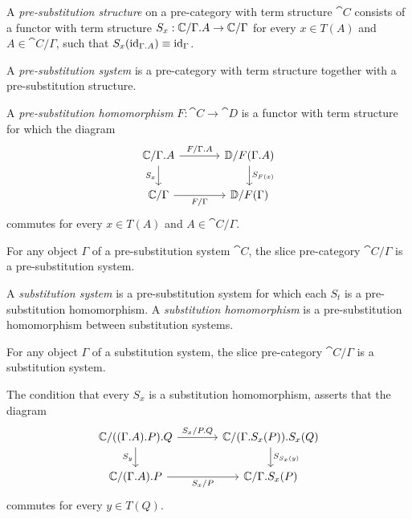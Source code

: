 \begin{defn}
A \emph{pre-substitution structure} on a pre-category with term structure $\cat{C}$ consists
of a functor with term structure $S_x:\cat{C}/\ctxext{\Gamma}{A}\to\cat{C}/\Gamma$ for every $x\in T(A)$ and
$A\in\cat{C}/\Gamma$, such that $S_x(\catid{\ctxext{\Gamma}{A}})\jdeq\catid{\Gamma}$.

A \emph{pre-substitution system} is a pre-category with term structure together with a
pre-substitution structure. 
\end{defn}

\begin{defn}
A \emph{pre-substitution homomorphism} $F:\cat{C}\to\cat{D}$ is a functor with term structure for
which the diagram
\begin{equation*}
\begin{tikzcd}[column sep=large]
\cat{C}/\ctxext{\Gamma}{A}
  \arrow[r,"F/\ctxext{\Gamma}{A}"]
  \arrow[d,swap,"S_x"]
  &
\cat{D}/F(\ctxext{\Gamma}{A})
  \arrow[d,"S_{F(x)}"]
  \\
\cat{C}/\Gamma
  \arrow[r,swap,"F/\Gamma"]
  &
\cat{D}/F(\Gamma)
\end{tikzcd}
\end{equation*}
commutes for every $x\in T(A)$ and $A\in\cat{C}/\Gamma$.
\end{defn}

\begin{lem}
For any object $\Gamma$ of a pre-substitution system $\cat{C}$, the slice pre-category
$\cat{C}/\Gamma	$ is a pre-substitution system.
\end{lem}

\begin{defn}
A \emph{substitution system} is a pre-substitution system for which each
$S_t$ is a pre-substitution homomorphism. A \emph{substitution homomorphism} is a
pre-substitution homomorphism between substitution systems.
\end{defn}

\begin{cor}
For any object $\Gamma$ of a substitution system, the slice pre-category $\cat{C}/\Gamma$
is a substitution system.
\end{cor}

\begin{rmk}
The condition that every $S_x$ is a substitution homomorphism, asserts that
the diagram
\begin{equation*}
\begin{tikzcd}[column sep=large]
\cat{C}/\ctxext{{{\Gamma}{A}}{P}}{Q}
  \arrow[r,"S_x/\ctxext{P}{Q}"]
  \arrow[d,swap,"S_y"]
  &
\cat{C}/\ctxext{{\Gamma}{S_x(P)}}{S_x(Q)}
  \arrow[d,"S_{S_x(y)}"]
  \\
\cat{C}/\ctxext{{\Gamma}{A}}{P}
  \arrow[r,swap,"S_x/P"]
  &
\cat{C}/\ctxext{\Gamma}{S_x(P)}
\end{tikzcd}
\end{equation*}
commutes for every $y\in T(Q)$.
\end{rmk}

